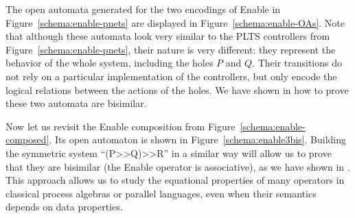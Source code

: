 \documentclass[smallcondensed]{svjour3}
\newcommand{\TODO}[1]{\textcolor{red}{\textbf{[TODO:#1]}}}
\begin{document}
The open automata generated for the two encodings of Enable in
Figure~\ref{schema:enable-pnets} are displayed in
Figure~\ref{schema:enable-OAs}.
Note that although these automata look very similar to the PLTS
controllers from Figure~\ref{schema:enable-pnets}, their nature is very
different: they represent the behavior of the whole system, including
the holes $P$ and $Q$. Their transitions do not rely on a particular
implementation of the controllers, but only encode the logical
relations between the actions of the holes.
We have shown in \cite{henrio:Forte2016} how to prove these two automata are bisimilar.
 

Now let us revisit the Enable composition from
Figure~\ref{schema:enable-composed}. Its open automaton is shown in
Figure~\ref{schema:enable3bis}. Building the symmetric system ``(P>>Q)>>R'' in a similar
way will allow us to prove that they are bisimilar (the Enable
operator is associative), as we have shown in \cite{HMZ:RR-2016}.
This approach allows us to study the equational properties of
many operators in classical process algebras or parallel languages, even
when their semantics depends on data properties.
\end{document}
